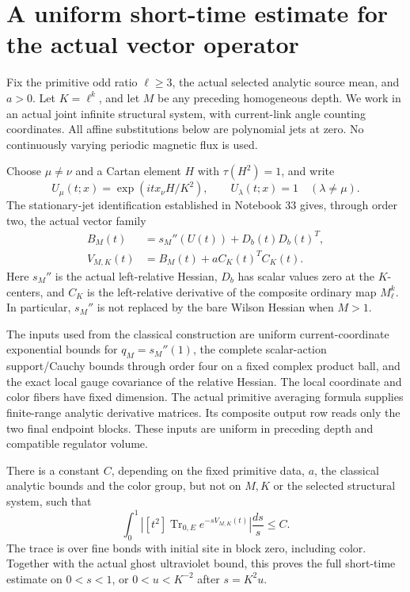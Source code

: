 \section{A uniform short-time estimate for the actual vector operator}
\label{vst-section}

Fix the primitive odd ratio \(\ell\ge3\), the actual selected analytic
source mean, and \(a>0\). Let \(K=\ell^k\), and let \(M\) be any
preceding homogeneous depth. We work in an actual joint infinite
structural system, with current-link angle counting coordinates.
All affine substitutions below are polynomial jets at zero.
No continuously varying periodic magnetic flux is used.

Choose \(\mu\ne\nu\) and a Cartan element \(H\) with
\(\tau(H^2)=1\), and write
\[
 U_\mu(t;x)=\exp(i t x_\nu H/K^2),\qquad U_\lambda(t;x)=1
                       \quad(\lambda\ne\mu).
\]
The stationary-jet identification established in Notebook 33 gives,
through order two, the actual vector family
\begin{equation}
 \begin{split}
 B_M(t)&=s_M''(U(t))+D_b(t)D_b(t)^T,\\
 V_{M,K}(t)&=B_M(t)+aC_K(t)^TC_K(t).
 \end{split}
 \label{vst-operators}
\end{equation}
Here \(s_M''\) is the actual left-relative Hessian,
\(D_b\) has scalar values zero at the \(K\)-centers, and \(C_K\)
is the left-relative derivative of the composite ordinary map
\(M_\ell^k\). In particular, \(s_M''\) is not replaced by the
bare Wilson Hessian when \(M>1\).

The inputs used from the classical construction are uniform
current-coordinate exponential bounds for \(q_M=s_M''(1)\),
the complete scalar-action support/Cauchy bounds through order
four on a fixed complex product ball, and the exact local gauge
covariance of the relative Hessian. The local coordinate and
color fibers have fixed dimension. The actual primitive
averaging formula supplies finite-range analytic derivative
matrices. Its composite output row reads only the two final
endpoint blocks. These inputs are uniform in preceding depth
and compatible regulator volume.

\begin{theorem}
\label{vst-theorem}
There is a constant \(C\), depending on the fixed primitive
data, \(a\), the classical analytic bounds and the color group,
but not on \(M,K\) or the selected structural system, such that
\begin{equation}
 \int_0^1\left|[t^2]\operatorname{Tr}_{0,E}
                         e^{-sV_{M,K}(t)}\right|\frac{ds}{s}
 \le C.
 \label{vst-main}
\end{equation}
The trace is over fine bonds with initial site in block zero,
including color. Together with the actual ghost ultraviolet
bound, this proves the full short-time estimate on
\(0<s<1\), or \(0<u<K^{-2}\) after \(s=K^2u\).
\end{theorem}

